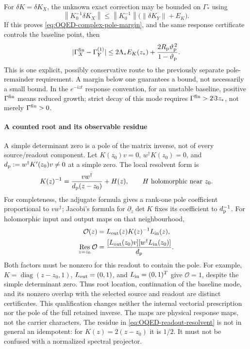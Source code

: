 \documentclass[final,5p,times,twocolumn,numbers,nopreprintline]{elsarticle}
\numberwithin{equation}{section}
\theoremstyle{definition}
\theoremstyle{remark}
\newcommand{\ii}{\mathrm i}
\newcommand{\diag}{\operatorname{diag}}
\newcommand{\norm}[1]{\left\lVert #1\right\rVert}
\begin{document}
For \(\delta K=\delta K_X\), the unknown exact correction may be
bounded on \(\Gamma_*\) using
\[
 \norm{K_0^{-1}\delta K_X}
 \leq\norm{K_0^{-1}}\bigl(\norm{\delta K_Y}+E_K\bigr).
\]
If this proves \eqref{eq:OQED-complex-pole-margin}, and the same
response certificate controls the baseline point, then
\begin{equation}
 |\Gamma_X^{\rm fin}-\Gamma_Y^{(1)}|
 \leq2\Lambda_*E_K(z_*)+
       \frac{2R_{\rm p}\vartheta_{\rm p}^{\,2}}
                     {1-\vartheta_{\rm p}}.
 \label{eq:OQED-combined-finite-rate-error}
\end{equation}
This is one explicit, possibly conservative route to the previously
separate pole-remainder requirement. A margin below one guarantees a
bound, not necessarily a small bound. In the \(e^{-\ii zt}\)
response convention, for an unstable baseline,
positive \(\Gamma^{\rm fin}\) means reduced growth; strict decay of
this mode requires \(\Gamma^{\rm fin}>2\Im z_*\), not merely
\(\Gamma^{\rm fin}>0\).

\paragraph{A counted root and its observable residue}
A simple determinant zero is a pole of the matrix inverse, not of every
source/readout component. Let \(K(z_0)v=0\),
\(w^\dagger K(z_0)=0\), and
\(d_{\rm p}:=w^\dagger K'(z_0)v\ne0\) at a simple zero.
The local resolvent form is \cite[Theorem~2.4]{Beyn2012}
\begin{equation}
 K(z)^{-1}=\frac{v w^\dagger}{d_{\rm p}(z-z_0)}+H(z),
 \qquad H\text{ holomorphic near }z_0.
 \label{eq:OQED-readout-resolvent}
\end{equation}
For completeness, the adjugate formula gives a rank-one pole
coefficient proportional to \(v w^\dagger\); Jacobi's formula for
\(\partial_z\det K\) fixes its coefficient to \(d_{\rm p}^{-1}\).
For holomorphic input and output maps on that neighbourhood,
\begin{equation}
 \begin{aligned}
 \mathcal O(z)&=L_{\rm out}(z)K(z)^{-1}L_{\rm in}(z),\\
 \mathop{\rm Res}_{z=z_0}\mathcal O
   &=\frac{[L_{\rm out}(z_0)v]
                   [w^\dagger L_{\rm in}(z_0)]}{d_{\rm p}}.
 \end{aligned}
 \label{eq:OQED-observable-pole-residue}
\end{equation}
Both factors must be nonzero for this readout to contain the pole.
For example, \(K=\diag(z-z_0,1)\),
\(L_{\rm out}=(0,1)\), and \(L_{\rm in}=(0,1)^T\) give
\(\mathcal O=1\), despite the simple determinant zero. Thus root
location, continuation of the baseline mode, and its nonzero overlap
with the selected source and readout are distinct certificates. This
qualification changes neither the internal vectorial prescription nor
the pole of the full retained inverse. The maps are physical response
maps, not the carrier characters. The residue in
\eqref{eq:OQED-readout-resolvent} is not in general an idempotent:
for \(K(z)=2(z-z_0)\) it is \(1/2\). It must not be confused
with a normalized spectral projector.
\end{document}
